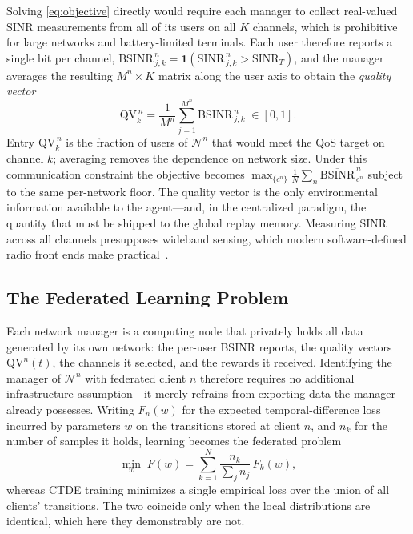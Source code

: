\documentclass[journal]{IEEEtran}
\begin{document}
Solving \eqref{eq:objective} directly would require each manager to collect
real-valued SINR measurements from all of its users on all $K$ channels, which
is prohibitive for large networks and battery-limited terminals. Each user
therefore reports a single bit per channel,
$\mathrm{BSINR}^{\,n}_{\,j,k}=\mathbf{1}(\mathrm{SINR}^{\,n}_{\,j,k} >
\mathrm{SINR}_{T})$, and the manager averages the resulting $M^{n}\times K$
matrix along the user axis to obtain the \emph{quality vector}
\begin{equation}
\mathrm{QV}^{\,n}_{k}
 = \frac{1}{M^{n}}\sum_{j=1}^{M^{n}} \mathrm{BSINR}^{\,n}_{\,j,k}
 \;\in[0,1] .
\label{eq:qv}
\end{equation}
Entry $\mathrm{QV}^{\,n}_{k}$ is the fraction of users of $\mathcal{N}^{n}$
that would meet the QoS target on channel $k$; averaging removes the dependence
on network size. Under this communication constraint the objective becomes
$\max_{\{c^{n}\}} \frac{1}{N}\sum_{n} \overline{\mathrm{BSINR}}^{\,n}_{\,c^{n}}$
subject to the same per-network floor. The quality vector is the only
environmental information available to the agent---and, in the centralized
paradigm, the quantity that must be shipped to the global replay memory.
Measuring SINR across all channels presupposes wideband sensing, which modern
software-defined radio front ends make practical~\cite{arjoune2019comprehensive}.

\subsection{The Federated Learning Problem}
\label{subsec:model_federated}

Each network manager is a computing node that privately holds all data
generated by its own network: the per-user BSINR reports, the quality vectors
$\mathrm{QV}^{n}(t)$, the channels it selected, and the rewards it received.
Identifying the manager of $\mathcal{N}^{n}$ with federated client $n$
therefore requires no additional infrastructure assumption---it merely refrains
from exporting data the manager already possesses. Writing $F_{n}(w)$ for the
expected temporal-difference loss incurred by parameters $w$ on the transitions
stored at client $n$, and $n_{k}$ for the number of samples it holds, learning
becomes the federated problem
\begin{equation}
\min_{w}\; F(w) = \sum_{k=1}^{N} \frac{n_{k}}{\sum_{j} n_{j}}\, F_{k}(w),
\label{eq:fed_objective}
\end{equation}
whereas CTDE training minimizes a single empirical loss over the union of all
clients' transitions. The two coincide only when the local distributions are
identical, which here they demonstrably are not.
\end{document}

